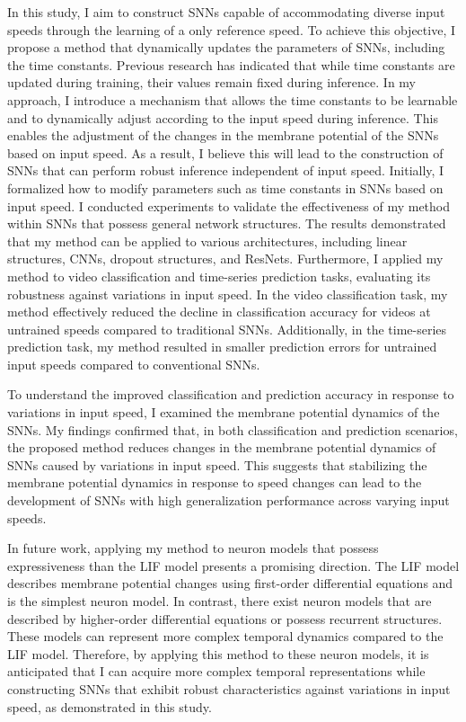 In this study, I aim to construct SNNs capable of accommodating diverse input speeds through the learning of a only reference speed. 
To achieve this objective, I propose a method that dynamically updates the parameters of SNNs, including the time constants. 
Previous research has indicated that while time constants are updated during training, their values remain fixed during inference. 
In my approach, I introduce a mechanism that allows the time constants to be learnable and to dynamically adjust according to the input speed during inference. 
This enables the adjustment of the changes in the membrane potential of the SNNs based on input speed. 
As a result, I believe this will lead to the construction of SNNs that can perform robust inference independent of input speed.
Initially, I formalized how to modify parameters such as time constants in SNNs based on input speed. 
I conducted experiments to validate the effectiveness of my method within SNNs that possess general network structures. 
The results demonstrated that my method can be applied to various architectures, including linear structures, CNNs, dropout structures, and ResNets. 
Furthermore, I applied my method to video classification and time-series prediction tasks, evaluating its robustness against variations in input speed. 
In the video classification task, my method effectively reduced the decline in classification accuracy for videos at untrained speeds compared to traditional SNNs. 
Additionally, in the time-series prediction task, my method resulted in smaller prediction errors for untrained input speeds compared to conventional SNNs.

To understand the improved classification and prediction accuracy in response to variations in input speed, I examined the membrane potential dynamics of the SNNs. 
My findings confirmed that, in both classification and prediction scenarios, the proposed method reduces changes in the membrane potential dynamics of SNNs caused by variations in input speed. 
This suggests that stabilizing the membrane potential dynamics in response to speed changes can lead to the development of SNNs with high generalization performance across varying input speeds.

In future work, applying my method to neuron models that possess expressiveness than the LIF model presents a promising direction. 
The LIF model describes membrane potential changes using first-order differential equations and is the simplest neuron model. 
In contrast, there exist neuron models that are described by higher-order differential equations or possess recurrent structures. 
These models can represent more complex temporal dynamics compared to the LIF model. 
Therefore, by applying this method to these neuron models, it is anticipated that I can acquire more complex temporal representations while constructing SNNs that exhibit robust characteristics against variations in input speed, as demonstrated in this study.


\clearpage
\pagestyle{fancy}